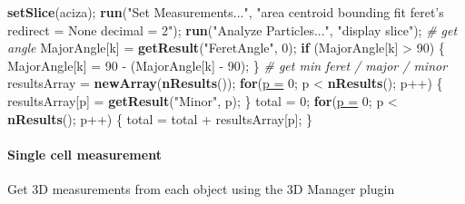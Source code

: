 \documentclass[11pt,singlespacinge,twoside]{reedthesis} %
\newenvironment{Shaded}{}{}
\newcommand{\CommentTok}[1]{\textit{#1}}
\newcommand{\ControlFlowTok}[1]{\textbf{#1}}
\newcommand{\DataTypeTok}[1]{\underline{#1}}
\newcommand{\DecValTok}[1]{#1}
\newcommand{\KeywordTok}[1]{\textbf{#1}}
\newcommand{\NormalTok}[1]{#1}
\newcommand{\OperatorTok}[1]{#1}
\newcommand{\StringTok}[1]{#1}
\theoremstyle{definition}
\theoremstyle{definition}
\theoremstyle{definition}
\theoremstyle{remark}
\begin{document}
\begin{Shaded}
\begin{Highlighting}[numbers=left,,]
        \KeywordTok{setSlice}\NormalTok{(aciza);}
        \KeywordTok{run}\NormalTok{(}\StringTok{"Set Measurements..."}\NormalTok{, }\StringTok{"area centroid bounding fit feret's redirect = None decimal = 2"}\NormalTok{);}
        \KeywordTok{run}\NormalTok{(}\StringTok{"Analyze Particles..."}\NormalTok{, }\StringTok{"display slice"}\NormalTok{);}
    \CommentTok{# get angle}
\NormalTok{        MajorAngle[k] =}\StringTok{ }\KeywordTok{getResult}\NormalTok{(}\StringTok{"FeretAngle"}\NormalTok{, }\DecValTok{0}\NormalTok{);}
        \ControlFlowTok{if}\NormalTok{ (MajorAngle[k] }\OperatorTok{>}\StringTok{ }\DecValTok{90}\NormalTok{) \{}
\NormalTok{          MajorAngle[k] =}\StringTok{ }\DecValTok{90} \OperatorTok{-}\StringTok{ }\NormalTok{(MajorAngle[k] }\OperatorTok{-}\StringTok{ }\DecValTok{90}\NormalTok{);}
\NormalTok{        \}}
    \CommentTok{# get min feret / major / minor}
\NormalTok{        resultsArray =}\StringTok{ }\KeywordTok{newArray}\NormalTok{(}\KeywordTok{nResults}\NormalTok{());}
            \ControlFlowTok{for}\NormalTok{(}\DataTypeTok{p =} \DecValTok{0}\NormalTok{; p }\OperatorTok{<}\StringTok{ }\KeywordTok{nResults}\NormalTok{(); p}\OperatorTok{++}\NormalTok{) \{ }
\NormalTok{            resultsArray[p] =}\StringTok{ }\KeywordTok{getResult}\NormalTok{(}\StringTok{"Minor"}\NormalTok{, p); }
\NormalTok{            \}}
\NormalTok{            total =}\StringTok{ }\DecValTok{0}\NormalTok{; }
            \ControlFlowTok{for}\NormalTok{(}\DataTypeTok{p =} \DecValTok{0}\NormalTok{; p }\OperatorTok{<}\StringTok{ }\KeywordTok{nResults}\NormalTok{(); p}\OperatorTok{++}\NormalTok{) \{ }
\NormalTok{                total =}\StringTok{ }\NormalTok{total }\OperatorTok{+}\StringTok{ }\NormalTok{resultsArray[p]; }
\NormalTok{            \}}
\end{Highlighting}
\end{Shaded}
\normalsize

\hypertarget{single-cell-measurement}{%
\paragraph{Single cell measurement}\label{single-cell-measurement}}

Get 3D measurements from each object using the 3D Manager plugin
\end{document}
